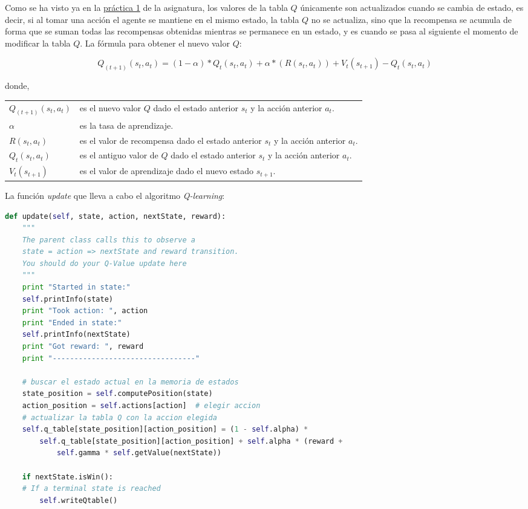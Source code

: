 \documentclass[11pt]{exam}
\makeatletter
\newenvironment{conditions}
{\par\vspace{\abovedisplayskip}\noindent\begin{tabular}{>{$}l<{$} @{${}\:{}$} l}}
	{\end{tabular}\par\vspace{\belowdisplayskip}}
\makeatother
\begin{document}
Como se ha visto ya en la \href{https://poliformat.upv.es/portal/site/ESP_0_2835/tool/c07b745a-0cfd-44f0-a7a2-9bb22f80c3f7?panel=Main}{práctica 1} de la asignatura, los valores de la tabla $Q$ únicamente son actualizados cuando se cambia de estado, es decir, si al tomar una acción el agente se mantiene en el mismo estado, la tabla $Q$ no se actualiza, sino que la recompensa se acumula de forma que se suman todas las recompensas obtenidas mientras se permanece en un estado, y es cuando se pasa al siguiente el momento de modificar la tabla $Q$. La fórmula para obtener el nuevo valor $Q$:

\begin{equation}\label{formula}
	Q_{(t+1)}(s_{t},a_{t}) = (1-\alpha) * Q_{t}(s_{t},a_{t}) + \alpha * (R(s_{t},a_{t})) + V_{t}(s_{t+1}) - Q_{t}(s_{t},a_{t})
\end{equation}

donde,

\begin{conditions}
	Q_{(t+1)}(s_{t},a_{t}) & es el nuevo valor $Q$ dado el estado anterior $s_{t}$ y la acción anterior $a_{t}$. \\
	\alpha & es la tasa de aprendizaje. \\
	R(s_{t},a_{t}) & es el valor de recompensa dado el estado anterior $s_{t}$ y la acción anterior $a_{t}$.	\\
	Q_{t}(s_{t},a_{t}) & es el antiguo valor de $Q$ dado el estado anterior $s_{t}$ y la acción anterior $a_{t}$.	\\
	V_{t}(s_{t+1}) & es el valor de aprendizaje dado el nuevo estado $s_{t+1}$.
\end{conditions}
\vspace*{3mm}

La función \textit{update} que lleva a cabo el algoritmo \textit{Q-learning}:
\vspace*{3mm}

\begin{lstlisting}[caption={Función update.}, label={update}, language=python, basicstyle=\footnotesize]
def update(self, state, action, nextState, reward):
	"""
	The parent class calls this to observe a
	state = action => nextState and reward transition.
	You should do your Q-Value update here
	"""	
	print "Started in state:"
	self.printInfo(state)
	print "Took action: ", action
	print "Ended in state:"
	self.printInfo(nextState)
	print "Got reward: ", reward
	print "---------------------------------"

	# buscar el estado actual en la memoria de estados
	state_position = self.computePosition(state)
	action_position = self.actions[action]  # elegir accion
	# actualizar la tabla Q con la accion elegida
	self.q_table[state_position][action_position] = (1 - self.alpha) * 
		self.q_table[state_position][action_position] + self.alpha * (reward + 
			self.gamma * self.getValue(nextState))

	if nextState.isWin():
	# If a terminal state is reached
		self.writeQtable()
\end{lstlisting}
\end{document}
